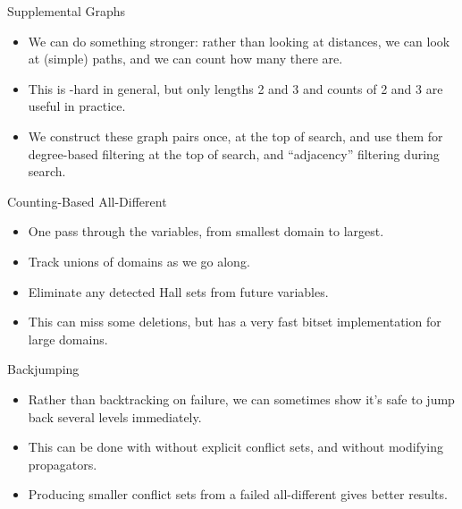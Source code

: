 \documentclass{beamer}
\begin{document}
\begin{frame}{Supplemental Graphs}
{
        \vspace{1em}
    }

     {
        \begin{itemize}
            \item We can do something stronger: rather than looking at distances, we can look at
                \textcolor{uofgrose}{(simple) paths}, and we can count how many there are.

            \item This is \NP-hard in general, but only \textcolor{uofgrose}{lengths 2 and 3} and
                counts of 2 and 3 are useful in practice.

            \item We construct these graph pairs \textcolor{uofgrose}{once, at the top of
                search}, and use them for degree-based filtering at the top of search, and
                ``adjacency'' filtering during search.
        \end{itemize}
    }
\end{frame}

\begin{frame}{Counting-Based All-Different}
    \begin{itemize}
        \item \textcolor{uofgrose}{One pass} through the variables, from smallest domain to largest.

        \item Track \textcolor{uofgrose}{unions of domains} as we go along.

        \item Eliminate \textcolor{uofgrose}{any detected Hall sets} from future variables.

        \item This \textcolor{uofgrose}{can miss some deletions}, but has a very fast bitset
            implementation for large domains.
    \end{itemize}
\end{frame}

\begin{frame}{Backjumping}
    \begin{itemize}
        \item Rather than backtracking on failure, we can sometimes show it's safe to
            \textcolor{uofgrose}{jump back several levels} immediately.
        \item This can be done with without explicit conflict sets, and without modifying
            propagators.
        \item Producing smaller conflict sets from a failed all-different gives better results.
    \end{itemize}
\end{frame}
\end{document}
